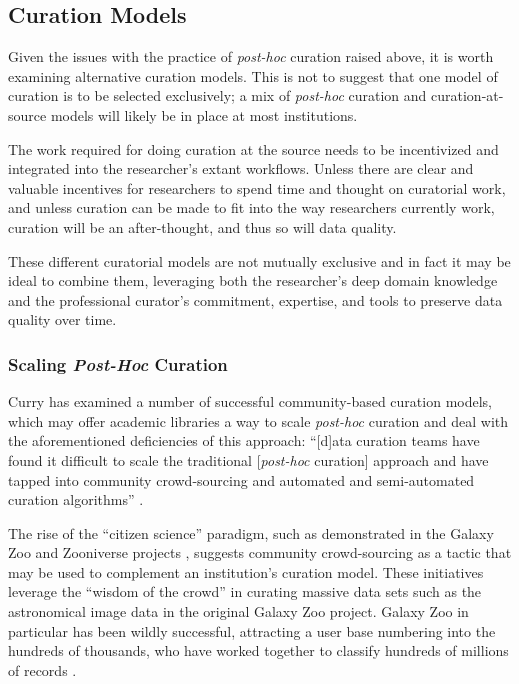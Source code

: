 \documentclass[man,12pt,biblatex]{apa6}
\begin{document}
\subsection{Curation Models}
Given the issues with the practice of \textit{post-hoc} curation
raised above, it is worth examining alternative curation models. This
is not to suggest that one model of curation is to be selected
exclusively; a mix of \textit{post-hoc} curation and
curation-at-source models will likely be in place at most
institutions.

The work required for doing curation at the source needs to be
incentivized and integrated into the researcher's extant
workflows. Unless there are clear and valuable incentives for
researchers to spend time and thought on curatorial work, and unless
curation can be made to fit into the way researchers currently work,
curation will be an after-thought, and thus so will data quality.

These different curatorial models are not mutually exclusive and in
fact it may be ideal to combine them, leveraging both the researcher's
deep domain knowledge and the professional curator's commitment,
expertise, and tools to preserve data quality over time.

\subsubsection{Scaling \textit{Post-Hoc} Curation}

Curry has examined a number of successful community-based curation
models, which may offer academic libraries a way to scale
\textit{post-hoc} curation and deal with the aforementioned
deficiencies of this approach: ``[d]ata curation teams have found it
difficult to scale the traditional [\textit{post-hoc} curation]
approach and have tapped into community crowd-sourcing and automated
and semi-automated curation algorithms'' \parencite{curry:community}.

The rise of the ``citizen science'' paradigm, such as demonstrated in
the Galaxy Zoo and Zooniverse projects
\parencite{wiki:galaxyzoo,adams:galaxyzoo}, suggests community
crowd-sourcing as a tactic that may be used to complement an
institution's curation model. These initiatives leverage the ``wisdom
of the crowd'' in curating   massive
data sets such as the astronomical image data in the original Galaxy
Zoo project. Galaxy Zoo in particular has been wildly successful,
attracting a user base numbering into the hundreds of thousands, who
have worked together to classify hundreds of millions of records
\parencite{adams:galaxyzoo}.
\end{document}
